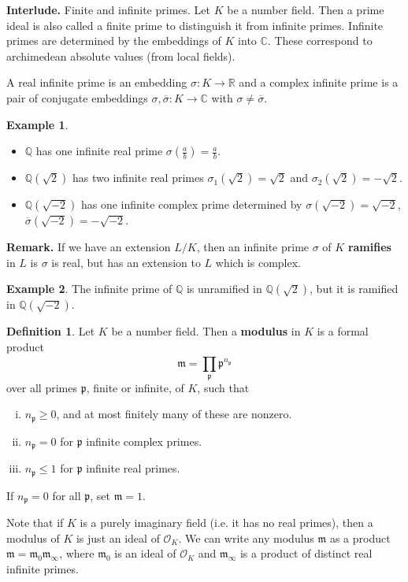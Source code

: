\documentclass{article}
\theoremstyle{definition}
\newtheorem{example}{Example}[section]
\newtheorem{defn}[theorem]{Definition}
\begin{document}
\textbf{Interlude.} Finite and infinite primes. Let $K$ be a number field. Then a prime ideal is also called a finite prime to distinguish it from infinite primes. Infinite primes are determined by the embeddings of $K$ into $\mathbb{C}$. These correspond to archimedean absolute values (from local fields).
\vspace{1mm}
 
A real infinite prime is an embedding $\sigma: K \to \mathbb{R}$ and a complex infinite prime is a pair of conjugate embeddings $\sigma, \overline{\sigma}: K \to \mathbb{C}$ with $\sigma \neq \overline{\sigma}$. 
\begin{example}
    \begin{itemize}
        \item $\mathbb{Q}$ has one infinite real prime $\sigma\left(\frac{a}{b}\right) = \frac{a}{b}$.
        \item $\mathbb{Q}(\sqrt{2})$ has two infinite real primes $\sigma_1(\sqrt{2}) =\sqrt{2}$ and $\sigma_2(\sqrt{2}) = -\sqrt{2}$.
        \item $\mathbb{Q}(\sqrt{-2})$ has one infinite complex prime determined by $\sigma(\sqrt{-2})=\sqrt{-2}$, $\overline{\sigma}(\sqrt{-2})=-\sqrt{-2}$.
    \end{itemize}
\end{example}
\textbf{Remark.} If we have an extension $L/K$, then an infinite prime $\sigma$ of $K$ \textbf{ramifies} in $L$ is $\sigma$ is real, but has an extension to $L$ which is complex.
\begin{example}
    The infinite prime of $\mathbb{Q}$ is unramified in $\mathbb{Q}(\sqrt{2})$, but it is ramified in $\mathbb{Q}(\sqrt{-2})$.
\end{example}
\begin{defn}
    Let $K$ be a number field. Then a \textbf{modulus} in $K$ is a formal product \[
        \mathfrak{m} = \prod_{\mathfrak{p}}^{} \mathfrak{p}^{n_{\mathfrak{p}}}
    \]
    over all primes $\mathfrak{p}$, finite or infinite, of $K$, such that
    \begin{enumerate}[(i)]
        \item $n_{\mathfrak{p}}\ge 0$, and at most finitely many of these are nonzero.
        \item $n_{\mathfrak{p}} = 0$ for $\mathfrak{p}$ infinite complex primes.
        \item $n_{\mathfrak{p}} \le 1$ for $\mathfrak{p}$ infinite real primes.
    \end{enumerate}
    If $n_{\mathfrak{p}} = 0$ for all $\mathfrak{p}$, set $\mathfrak{m} = 1$.
\end{defn}
Note that if $K$ is a purely imaginary field (i.e. it has no real primes), then a modulus of $K$ is just an ideal of $\mathcal{O}_K$. We can write any modulus $\mathfrak{m}$ as a product $\mathfrak{m} = \mathfrak{m}_0 \mathfrak{m}_{\infty}$, where $\mathfrak{m}_0$ is an ideal of $\mathcal{O}_K$ and $\mathfrak{m}_{\infty}$ is a product of distinct real infinite primes. 
\end{document}
